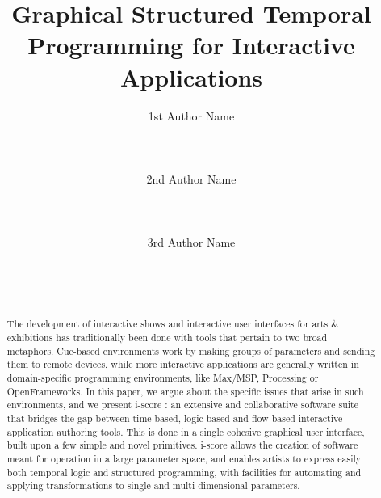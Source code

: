 \documentclass{sigchi}
\begin{document}
\title{Graphical Structured Temporal Programming for Interactive Applications}

\author{
  \alignauthor 1st Author Name\\
    \\
    \\
    \\
  \alignauthor 2nd Author Name\\
    \\
    \\
    \\
  \alignauthor 3rd Author Name\\
    \\
    \\
    \\
}

\maketitle

\begin{abstract}
  The development of interactive shows and interactive user interfaces for arts \& exhibitions
has traditionally been done with tools that pertain to two broad metaphors. 
Cue-based environments work by making groups of parameters and sending them to remote devices, 
while more interactive applications are generally written in domain-specific 
programming environments, like Max/MSP, Processing or OpenFrameworks.
  In this paper, we argue about the specific issues that arise in such environments, and we present 
i-score : an extensive and collaborative software suite that bridges
the gap between time-based, logic-based and flow-based interactive application authoring tools. 
This is done in a single cohesive graphical user interface, built upon a few simple and novel primitives.
  i-score allows the creation of software meant for operation in a large parameter space, 
and enables artists to express easily both temporal logic and structured programming, 
with facilities for automating and applying transformations to single and multi-dimensional parameters.
\end{abstract}

\end{document}
